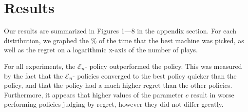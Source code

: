 
\section{Results}
\label{sec:results}

Our results are summarized in Figures 1---8 in the appendix
section. For each distribution, we graphed the \% of the time that the
best machine was picked, as well as the regret on a logarithmic x-axis
of the number of plays.

For all experiments, the $\mathcal{E}_n$- policy
outperformed the  policy. This was measured by the fact
that the $\mathcal{E}_n$- policies converged to the
best policy quicker than the  policy, and that the
 policy had a much higher regret than the other
policies. Furthermore, it appears that higher values of the parameter
$c$ result in worse performing policies judging by regret, however
they did not differ greatly.